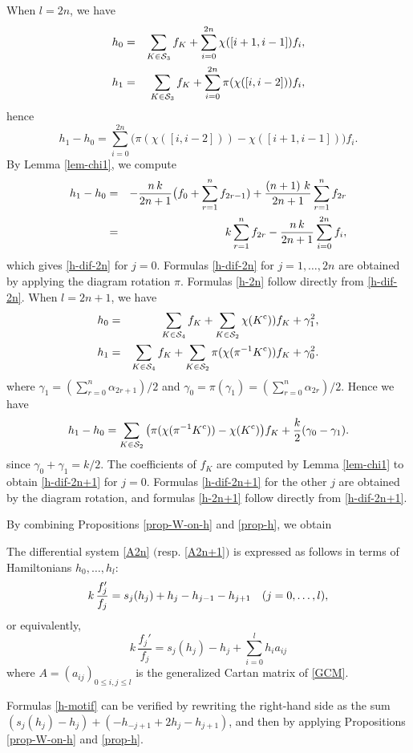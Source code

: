 \begin{pf}
When $l=2n$, we have 
\begin{eqnarray}
h_0&=&\sum_{K\in{\cal S}_3} f_K+\sum_{i=0}^{2n} \chi([i+1,i-1]) f_i,
\\
h_{1}&=&\sum_{K\in{\cal S}_3} f_K+\sum_{i=0}^{2n} \pi(\chi([i,i-2])) f_i,\notag
\end{eqnarray}
hence
\begin{equation}
h_{1}-h_0=\sum_{i=0}^{2n}\big( \pi(\chi([i,i-2]))-\chi([i+1,i-1])\big)f_i.
\end{equation}
By Lemma \ref{lem-chi1}, we compute
\begin{eqnarray}
h_{1}-h_0&=&-\frac{n\,k}{2n+1}\big(f_0+ \sum_{r=1}^n f_{2r-1})
+\frac{(n+1)\ k}{2n+1}\sum_{r=1}^n f_{2r}
\\ 
&=&k\sum_{r=1}^n f_{2r} - \frac{n\,k}{2n+1}\sum_{i=0}^{2n} f_i, 
\notag
\end{eqnarray}
which gives \eqref{h-dif-2n} for $j=0$.   
Formulas \eqref{h-dif-2n} for $j=1,\ldots,2n$ are obtained by applying 
the diagram rotation $\pi$. 
Formulas \eqref{h-2n} follow directly from \eqref{h-dif-2n}. 
When $l=2n+1$, we have 
\begin{eqnarray}
h_{0}&=&\sum_{K\in{\cal S}_4} f_K
+\sum_{K\in{\cal S}_2}\chi(K^{\text{c}})) f_K+\gamma_1^2,\\
h_{1}&=&\sum_{K\in{\cal S}_4} f_K
+\sum_{K\in{\cal S}_2} \pi(\chi(\pi^{-1}K^{\text{c}})) f_K+\gamma_0^2.\notag
\end{eqnarray}
where $\gamma_1=(\sum_{r=0}^n\alpha_{2r+1})/2$ and 
$\gamma_0=\pi(\gamma_1)=(\sum_{r=0}^n\alpha_{2r})/2$. 
Hence we have 
\begin{equation}
h_{1}-h_{0}=
\sum_{K\in{\cal S}_2}\big(\pi(\chi(\pi^{-1}K^{\text{c}}))- 
\chi(K^{\text{c}})\big)f_K+\frac{k}{2}(\gamma_0-\gamma_1).\notag
\end{equation}
since $\gamma_0+\gamma_1=k/2$. 
The coefficients of $f_K$ are computed by Lemma \ref{lem-chi1} to obtain 
\eqref{h-dif-2n+1} for $j=0$. 
Formulas \eqref{h-dif-2n+1} for the other $j$ are obtained by the diagram rotation, 
and formulas \eqref{h-2n+1} follow directly from \eqref{h-dif-2n+1}. 
\end{pf}

By combining Propositions \ref{prop-W-on-h} and \ref{prop-h}, we obtain 

\begin{prop}
The differential system \eqref{A2n} $($resp. \eqref{A2n+1}$)$ is expressed 
as follows in terms of Hamiltonians $h_0,\ldots,h_l$:
\begin{equation}\Label{h-motif}
k \,\frac{f_j'}{f_j}=s_j(h_j)+ h_j-h_{j-1}-h_{j+1}\quad(j=0,\ldots,l),
\end{equation}
or equivalently, 
\begin{equation}
k \,\frac{f_j'}{f_j}= s_j(h_j)-h_j+\sum_{i=0}^l h_{i}a_{ij}
\end{equation}
where $A=(a_{ij})_{0\le i,j\le l}$ is the generalized Cartan matrix 
of \eqref{GCM}.
\end{prop}
\noindent
Formulas \eqref{h-motif} can be verified by rewriting the right-hand side 
as the sum $(s_j(h_j)-h_j)+(-h_{-j+1}+2 h_j - h_{j+1})$, and then by applying 
Propositions \ref{prop-W-on-h} and \ref{prop-h}. 

